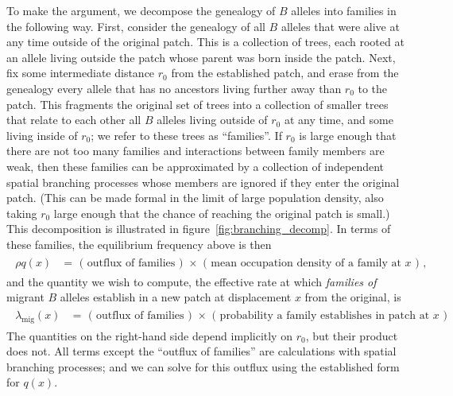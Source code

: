 \documentclass{article}
\newcommand{\migrate}{\lambda_\text{mig}}
\begin{document}
To make the argument, we decompose the genealogy of $B$ alleles into families in the following way.
First, consider the genealogy of all $B$ alleles that were alive at any time outside of the original patch.  
This is a collection of trees, each rooted at an allele living outside the patch whose parent was born inside the patch.
Next, fix some intermediate distance $r_0$ from the established patch,
and erase from the genealogy every allele that has no ancestors living further away than $r_0$ to the patch.
This fragments the original set of trees into a collection of smaller trees that relate to each other all $B$ alleles living outside of $r_0$ at any time,
and some living inside of $r_0$;
we refer to these trees as ``families''.
If $r_0$ is large enough that there are not too many families
and interactions between family members are weak,
then these families can be approximated 
by a collection of independent spatial branching processes
whose members are ignored if they enter the original patch.
(This can be made formal in the limit of large population density, also taking $r_0$ large enough that the chance of reaching the original patch is small.)
This decomposition is illustrated in figure~\ref{fig:branching_decomp}.
In terms of these families, the equilibrium frequency above is then
\begin{align}
    \label{eqn:gestalt_q}
    \begin{split}
        \rho q(x) &= \text{ ( outflux of families ) } \times \text{ ( mean occupation density of a family at $x$ ) } ,
\end{split}
\end{align}
and the quantity we wish to compute,
the effective rate at which \emph{families of} migrant $B$ alleles establish in a new patch at displacement $x$ from the original,
is
\begin{align}
    \label{eqn:gestalt_migrate}
    \begin{split}
        \migrate(x) &= \text{ ( outflux of families ) } \times \text{ ( probability a family establishes in patch at $x$ ) }
    \end{split}
\end{align}
The quantities on the right-hand side depend implicitly on $r_0$,
but their product does not.
All terms except the ``outflux of families'' are calculations with spatial branching processes;
and we can solve for this outflux using the established form for $q(x)$.
\end{document}
